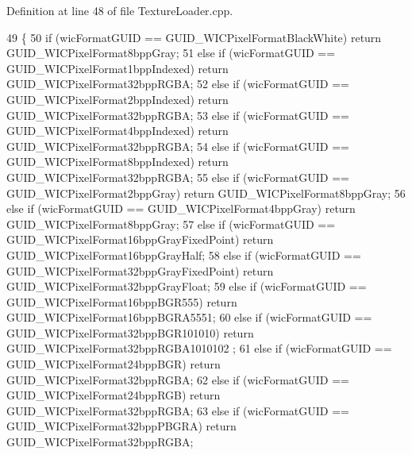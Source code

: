 Definition at line 48 of file Texture\+Loader.\+cpp.


\begin{DoxyCode}
49 \{
50     \textcolor{keywordflow}{if} (wicFormatGUID == GUID\_WICPixelFormatBlackWhite) \textcolor{keywordflow}{return} GUID\_WICPixelFormat8bppGray;
51     \textcolor{keywordflow}{else} \textcolor{keywordflow}{if} (wicFormatGUID == GUID\_WICPixelFormat1bppIndexed) \textcolor{keywordflow}{return} GUID\_WICPixelFormat32bppRGBA;
52     \textcolor{keywordflow}{else} \textcolor{keywordflow}{if} (wicFormatGUID == GUID\_WICPixelFormat2bppIndexed) \textcolor{keywordflow}{return} GUID\_WICPixelFormat32bppRGBA;
53     \textcolor{keywordflow}{else} \textcolor{keywordflow}{if} (wicFormatGUID == GUID\_WICPixelFormat4bppIndexed) \textcolor{keywordflow}{return} GUID\_WICPixelFormat32bppRGBA;
54     \textcolor{keywordflow}{else} \textcolor{keywordflow}{if} (wicFormatGUID == GUID\_WICPixelFormat8bppIndexed) \textcolor{keywordflow}{return} GUID\_WICPixelFormat32bppRGBA;
55     \textcolor{keywordflow}{else} \textcolor{keywordflow}{if} (wicFormatGUID == GUID\_WICPixelFormat2bppGray) \textcolor{keywordflow}{return} GUID\_WICPixelFormat8bppGray;
56     \textcolor{keywordflow}{else} \textcolor{keywordflow}{if} (wicFormatGUID == GUID\_WICPixelFormat4bppGray) \textcolor{keywordflow}{return} GUID\_WICPixelFormat8bppGray;
57     \textcolor{keywordflow}{else} \textcolor{keywordflow}{if} (wicFormatGUID == GUID\_WICPixelFormat16bppGrayFixedPoint) \textcolor{keywordflow}{return} 
      GUID\_WICPixelFormat16bppGrayHalf;
58     \textcolor{keywordflow}{else} \textcolor{keywordflow}{if} (wicFormatGUID == GUID\_WICPixelFormat32bppGrayFixedPoint) \textcolor{keywordflow}{return} 
      GUID\_WICPixelFormat32bppGrayFloat;
59     \textcolor{keywordflow}{else} \textcolor{keywordflow}{if} (wicFormatGUID == GUID\_WICPixelFormat16bppBGR555) \textcolor{keywordflow}{return} GUID\_WICPixelFormat16bppBGRA5551;
60     \textcolor{keywordflow}{else} \textcolor{keywordflow}{if} (wicFormatGUID == GUID\_WICPixelFormat32bppBGR101010) \textcolor{keywordflow}{return} GUID\_WICPixelFormat32bppRGBA1010102
      ;
61     \textcolor{keywordflow}{else} \textcolor{keywordflow}{if} (wicFormatGUID == GUID\_WICPixelFormat24bppBGR) \textcolor{keywordflow}{return} GUID\_WICPixelFormat32bppRGBA;
62     \textcolor{keywordflow}{else} \textcolor{keywordflow}{if} (wicFormatGUID == GUID\_WICPixelFormat24bppRGB) \textcolor{keywordflow}{return} GUID\_WICPixelFormat32bppRGBA;
63     \textcolor{keywordflow}{else} \textcolor{keywordflow}{if} (wicFormatGUID == GUID\_WICPixelFormat32bppPBGRA) \textcolor{keywordflow}{return} GUID\_WICPixelFormat32bppRGBA;

\end{DoxyCode}
